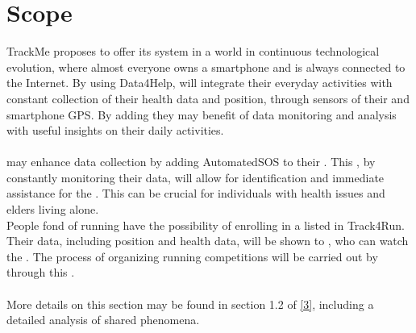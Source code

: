 \documentclass[../../DD.tex]{subfiles}
\begin{document}
\section{Scope}
	TrackMe proposes to offer its system in a world in continuous technological evolution, where almost everyone owns a smartphone and is always connected to the Internet.
	By using Data4Help,  will integrate their everyday activities with constant collection of their health data and position, through sensors of their  and smartphone GPS. By adding  they may benefit of data monitoring and analysis with useful insights on their daily activities.\\\\
	 may enhance data collection by adding AutomatedSOS to their . This , by constantly monitoring their data, will allow for  identification and immediate assistance for the . This can be crucial for individuals with health issues and elders living alone.\\
	People fond of running have the possibility of enrolling in a  listed in Track4Run. Their data, including position and health data, will be shown to , who can watch the . The process of organizing running competitions will be carried out by  through this .\\\\
	More details on this section may be found in section 1.2 of \hyperref[ref:3]{[3]}, including a detailed analysis of shared phenomena.
\end{document}
